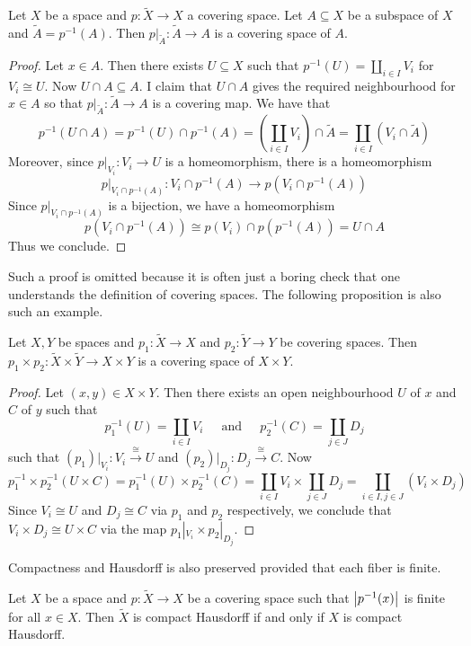 \documentclass[a4paper]{article}
\begin{document}
\begin{prp}{}{} Let $X$ be a space and $p:\tilde{X}\to X$ a covering space. Let $A\subseteq X$ be a subspace of $X$ and $\tilde{A}=p^{-1}(A)$. Then $p|_{\tilde{A}}:\tilde{A}\to A$ is a covering space of $A$. \tcbline
\begin{proof}
Let $x\in A$. Then there exists $U\subseteq X$ such that $p^{-1}(U)=\coprod_{i\in I}V_i$ for $V_i\cong U$. Now $U\cap A\subseteq A$. I claim that $U\cap A$ gives the required neighbourhood for $x\in A$ so that $p|_{\widetilde{A}}:\widetilde{A}\to A$ is a covering map. We have that $$p^{-1}(U\cap A)=p^{-1}(U)\cap p^{-1}(A)=\left(\coprod_{i\in I}V_i\right)\cap\tilde{A}=\coprod_{i\in I}(V_i\cap\widetilde{A})$$ Moreover, since $p|_{V_i}:V_i\to U$ is a homeomorphism, there is a homeomorphism $$p|_{V_i\cap p^{-1}(A)}:V_i\cap p^{-1}(A)\to p(V_i\cap p^{-1}(A))$$ Since $p|_{V_i\cap p^{-1}(A)}$ is a bijection, we have a homeomorphism $$p(V_i\cap p^{-1}(A))\cong p(V_i)\cap p(p^{-1}(A))=U\cap A$$ Thus we conclude. 
\end{proof}
\end{prp}

Such a proof is omitted because it is often just a boring check that one understands the definition of covering spaces. The following proposition is also such an example. 

\begin{prp}{}{} Let $X,Y$ be spaces and $p_1:\tilde{X}\to X$ and $p_2:\tilde{Y}\to Y$ be covering spaces. Then $p_1\times p_2:\tilde{X}\times\tilde{Y}\to X\times Y$ is a covering space of $X\times Y$. \tcbline
\begin{proof}
Let $(x,y)\in X\times Y$. Then there exists an open neighbourhood $U$ of $x$ and $C$ of $y$ such that $$p_1^{-1}(U)=\coprod_{i\in I}V_i\;\;\;\;\text{ and }\;\;\;\;p_2^{-1}(C)=\coprod_{j\in J}D_j$$ such that $(p_1)|_{V_i}:V_i\overset{\cong}{\longrightarrow}U$ and $(p_2)|_{D_j}:D_j\overset{\cong}{\longrightarrow}C$. Now $$p_1^{-1}\times p_2^{-1}(U\times C)=p_1^{-1}(U)\times p_2^{-1}(C)=\coprod_{i\in I}V_i\times\coprod_{j\in J}D_j=\coprod_{i\in I,j\in J}(V_i\times D_j)$$ Since $V_i\cong U$ and $D_j\cong C$ via $p_1$ and $p_2$ respectively, we conclude that $V_i\times D_j\cong U\times C$ via the map $p_1|_{V_i}\times p_2|_{D_j}$. 
\end{proof}
\end{prp}

Compactness and Hausdorff is also preserved provided that each fiber is finite. 

\begin{prp}{}{} Let $X$ be a space and $p:\tilde{X}\to X$ be a covering space such that $\abs{p^{-1}(x)}$ is finite for all $x\in X$. Then $\tilde{X}$ is compact Hausdorff if and only if $X$ is compact Hausdorff. 
\end{prp}
\end{document}
